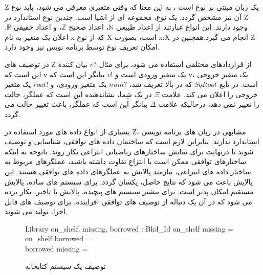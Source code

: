 Z یک زبان مبتنی بر نوع است ، به این معنا که وقتی متغیری معرفی می شود، باید نوع آن نیز مشخص گردد. یک نوع، مجموعه ای از اشیا است. چندین نوع استاندارد در Z وجود دارند. این انواع عبارتند از اعداد طبیعی $\mathbb{N}$، اعداد صحیح $\mathbb{Z}$، و اعداد حقیقی $\mathbb{R}$. اعلان یک متغیر به نام x که از نوع X است، بصورت x:X انجام می گیرد.همچنین در Z امکان تعریف نوع توسط برنامه نویس نیز وجود دارد.

در توصیف های Z از قراردادهای مختلفی استفاده می شود، برای مثال $v?$ بیان کننده این است که v یک متغیر ورودی است و $v!$ بیانگر این است که v، یک متغیر خروجی است. در تابع $SqRoot$ که در بالا تعریف شد، $num?$ یک متغیر ورودی، و $root!$ یک متغیر خروجی را اعلان می کند. علامت $\Xi$ در یک شِما، نشاندهنده این است که عملگر، حالت را تغییر نمی دهد، درحالیکه علامت $\Delta$ بیانگر این است که عملگر، باعث تغییر حالت می گردد.

بسیاری از انواع داده های مورد استفاده در Z، مشابهی در زبان های برنامه نویسی استاندارد ندارند. بنابراین لازم است که ساختمان داده های توافقی، شناسایی و توصیف شوند تا درنهایت برای نمایش ساختارهای ریاضیاتی انتزاعی بکار روند. باتوجه به اینکه ساختارهای توافقی ممکن است با انتزاع تفاوت داشته باشند، عملگرهای مربوط به ساختار داده های انتزاعی، نیازمند پالایش به عملگرهای  داده های توافقی هستند. این پالایش باعث می شود که نتایج حاصل، یکسان گردد. برای سیستم های ساده، پالایش مستقیم امکان پذیر است. برای بیشتر سیستم های پیچیده، پالایش با تاخیر، بکار برده می شود که در آن یک دنباله از توصیف های توافقی افزاینده، برای توصیف های قابل اجرا، تولید می شوند.
\begin{figure}
\centering
\begin{schema}{Library}
on\_shelf, missing, borrowed :  Bkd\_Id
\where
on\_shelf \cap missing = \oslash\\
on\_shelf \cap borrowed = \oslash \\
borrowed \cap missing = \oslash
\end{schema}
\caption{توصیف یک سیستم کتابخانه}
\label{Library}
\end{figure}

